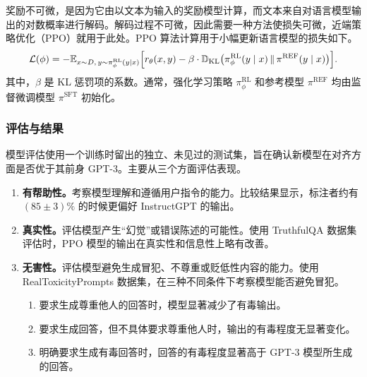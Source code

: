 奖励不可微，是因为它由以文本为输入的奖励模型计算，而文本来自对语言模型输出的对数概率进行解码。解码过程不可微，因此需要一种方法使损失可微，近端策略优化（PPO）就用于此处。PPO 算法计算用于小幅更新语言模型的损失如下。
\begin{equation}
\mathcal{L}(\phi)=
-\mathbb{E}_{x\sim D,\,y\sim\pi_\phi^{\mathrm{RL}}(y\mid x)}
\Bigl[
r_\theta(x,y)-\beta\cdot\mathbb{D}_{\mathrm{KL}}
\bigl(\pi_\phi^{\mathrm{RL}}(y\mid x)\,\|\,\pi^{\mathrm{REF}}(y\mid x)\bigr)
\Bigr].
\label{eq:ch05-instruct-ppo}
\end{equation}
其中，$\beta$ 是 KL 惩罚项的系数。通常，强化学习策略 $\pi_\phi^{\mathrm{RL}}$ 和参考模型 $\pi^{\mathrm{REF}}$ 均由监督微调模型 $\pi^{\mathrm{SFT}}$ 初始化。


\subsubsection{评估与结果}
模型评估使用一个训练时留出的独立、未见过的测试集，旨在确认新模型在对齐方面是否优于其前身 GPT-3。主要从三个方面评估表现。

\begin{enumerate}
\item \textbf{有帮助性。}考察模型理解和遵循用户指令的能力。比较结果显示，标注者约有 $(85\pm3)\%$ 的时候更偏好 InstructGPT 的输出。
\item \textbf{真实性。}评估模型产生“幻觉”或错误陈述的可能性。使用 TruthfulQA 数据集评估时，PPO 模型的输出在真实性和信息性上略有改善。
\item \textbf{无害性。}评估模型避免生成冒犯、不尊重或贬低性内容的能力。使用 RealToxicityPrompts 数据集，在三种不同条件下考察模型能否避免冒犯。
  \begin{enumerate}[label=\alph*.]
  \item 要求生成尊重他人的回答时，模型显著减少了有毒输出。
  \item 要求生成回答，但不具体要求尊重他人时，输出的有毒程度无显著变化。
  \item 明确要求生成有毒回答时，回答的有毒程度显著高于 GPT-3 模型所生成的回答。
  \end{enumerate}
\end{enumerate}

